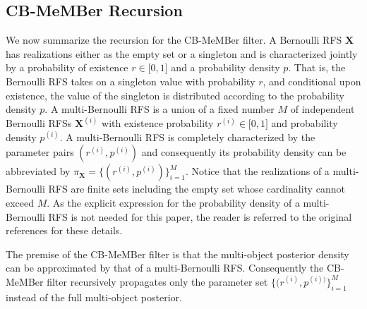 \documentclass[twocolumn]{autart}
\begin{document}
\subsection{CB-MeMBer Recursion}

We now summarize the recursion for the CB-MeMBer filter. A Bernoulli RFS $\mathbf{X}$ has realizations either as the empty set or a
singleton and is characterized jointly by a probability of existence $r\in
\lbrack 0,1]$ and a probability density $p$. That is, the Bernoulli RFS
takes on a singleton value with probability $r$, and conditional upon
existence, the value of the singleton is distributed according to the
probability density $p$. A multi-Bernoulli RFS is a union of a fixed number $M$ of independent Bernoulli RFSs $\mathbf{X}^{(i)}$ with existence
probability $r^{(i)}\in \lbrack 0,1]$ and probability density $p^{(i)}$. A
multi-Bernoulli RFS is completely characterized by the parameter pairs $(r^{(i)},p^{(i)})$ and consequently its probability density can be
abbreviated by $\pi _{\mathbf{X}}=\{(r^{(i)},p^{(i)})\}_{i=1}^{M}$. Notice
that the realizations of a multi-Bernoulli RFS are finite sets including the
empty set whose cardinality cannot exceed $M$. As the explicit expression
for the probability density of a multi-Bernoulli RFS is not needed for this
paper, the reader is referred to the original references \cite {Mah07,VVC09} for these details.

The premise of the CB-MeMBer filter is that the multi-object posterior
density can be approximated by that of a multi-Bernoulli RFS. Consequently
the CB-MeMBer filter recursively propagates only the parameter set $\{(r^{(i)},p^{(i))}\}_{i=1}^{M}$ instead of the full multi-object posterior.
\end{document}
